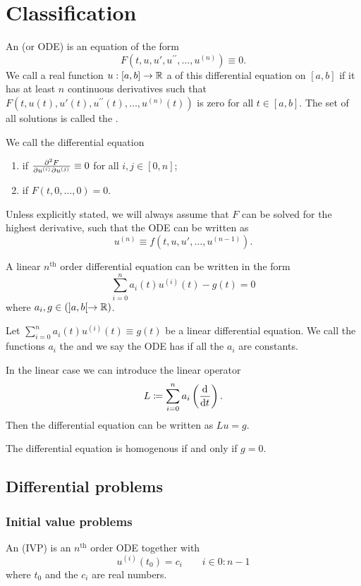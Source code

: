 \section{Classification}
\begin{definition}
An  (or ODE) is an equation of the form
\[ F(t, u, u', u^{\prime\prime}, \ldots, u^{(n)}) \equiv 0. \]
We call a real function $u: [a,b] \to \mathbb{R}$ a  of this differential equation on $[a,b]$
if it has at least $n$ continuous derivatives such that $F(t, u(t), u'(t), u^{\prime\prime}(t), \ldots, u^{(n)}(t))$ is zero for all $t\in [a,b]$. The set of all solutions is called the .

We call the differential equation
\begin{enumerate}
\item {} if $\md{F}{2}{u^{(i)}}{}{u^{(j)}}{} \equiv 0$ for all $i,j\in [0,n]$;
\item {} if $F(t, 0,\ldots, 0) = 0$.
\end{enumerate}
Unless explicitly stated, we will always assume that $F$ can be solved for the highest derivative, such that the ODE can be written as
\[ u^{(n)} \equiv f(t,u,u',\ldots, u^{(n-1)}). \]
\end{definition}

A linear $n^\text{th}$ order differential equation can be written in the form
\[ \sum_{i=0}^n a_{i}(t)u^{(i)}(t) - g(t) = 0 \]
where $a_i, g \in (]a,b[\to\mathbb{R})$.

\begin{definition}
Let $\sum_{i=0}^n a_{i}(t)u^{(i)}(t) \equiv g(t)$ be a linear differential equation. We call the functions $a_i$ the  and we say the ODE has  if all the $a_i$ are constants.
\end{definition}

In the linear case we can introduce the linear operator
\[ L \coloneqq \sum_{i=0}^n a_{i} \left(\mathinner{ \dfrac{\operatorname{d \!}{^{}}}{\operatorname{d \!}{{t}^{}}} }\right). \]
Then the differential equation can be written as $Lu = g$.

The differential equation is homogenous if and only if $g = 0$.

\subsection{Differential problems}
\subsubsection{Initial value problems}
\begin{definition}
An  (IVP) is an $n^{\text{th}}$ order ODE together with 
\[ u^{(i)}(t_0) = c_i \qquad i \in 0:n-1 \]
where $t_0$ and the $c_i$ are real numbers.
\end{definition}

